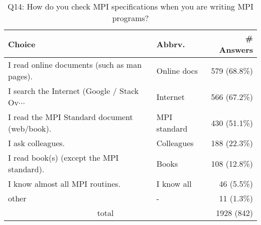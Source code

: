\begin{table}[htb]%
\begin{center}%
\caption{Q14: How do you check MPI specifications when you are writing MPI programs?}%
\label{tab:Q14-ans}%
\begin{tabular}{l|l|r}%
\hline%
Choice & Abbrv. & \# Answers \\%
\hline%
{\small I read online documents (such as man pages).} & Online docs & 579 (68.8\%) \\%
{\small I search the Internet (Google / Stack Ov$\cdots$} & Internet & 566 (67.2\%) \\%
{\small I read the MPI Standard document (web/book).} & MPI standard & 430 (51.1\%) \\%
I ask colleagues. & Colleagues & 188 (22.3\%) \\%
{\small I read book(s) (except the MPI standard).} & Books & 108 (12.8\%) \\%
I know almost all MPI routines. & I know all & 46 (5.5\%) \\%
other & - & 11 (1.3\%) \\%
\hline%
\multicolumn{2}{c}{total} & 1928 (842)\\%
\hline%
\end{tabular}%
\end{center}%
\end{table}%
